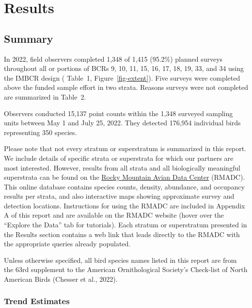 \documentclass[
  letterpaper,
  DIV=11,
  numbers=noendperiod,
  oneside]{scrreprt}
\begin{document}
\part{Results}

\hypertarget{summary}{%
\chapter{Summary}\label{summary}}

In 2022, field observers completed 1,348 of 1,415 (95.2\%) planned
surveys throughout all or portions of BCRs 9, 10, 11, 15, 16, 17, 18,
19, 33, and 34 using the IMBCR design ( Table~{1},
Figure~\ref{fig-extent}). Five surveys were completed above the funded
sample effort in two strata. Reasons surveys were not completed are
summarized in Table~{2}.

Observers conducted 15,137 point counts within the 1,348 surveyed
sampling units between May 1 and July 25, 2022. They detected 176,954
individual birds representing 350 species.

Please note that not every stratum or superstratum is summarized in this
report. We include details of specific strata or superstrata for which
our partners are most interested. However, results from all strata and
all biologically meaningful superstrata can be found on the
\href{http://rmbo.org/v3/avian/ExploretheData.aspx}{Rocky Mountain Avian
Data Center} (RMADC). This online database contains species counts,
density, abundance, and occupancy results per strata, and also
interactive maps showing approximate survey and detection locations.
Instructions for using the RMADC are included in Appendix A of this
report and are available on the RMADC website (hover over the ``Explore
the Data'' tab for tutorials). Each stratum or superstratum presented in
the Results section contains a web link that leads directly to the RMADC
with the appropriate queries already populated.

Unless otherwise specified, all bird species names listed in this report
are from the 63rd supplement to the American Ornithological Society's
Check-list of North American Birds (Chesser et al., 2022).

\hypertarget{trend-estimates}{%
\section*{Trend Estimates}\label{trend-estimates}}

\end{document}
